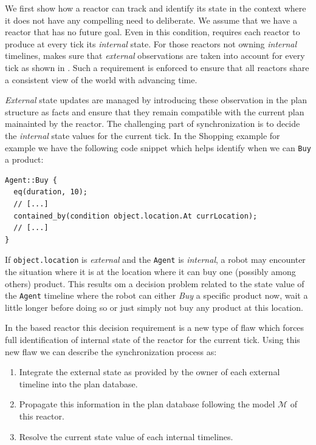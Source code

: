 We first show how a reactor can track and identify its state in the
context where it does not have any compelling need to deliberate. We
assume that we have a reactor that has no future goal. Even in this
condition, \rx requires each reactor to produce at every tick its {\em
  internal} state. For those reactors not owning {\em internal}
timelines, \rx makes sure that {\em external} observations are taken
into account for every tick as shown in \cite{py10}. Such a
requirement is enforced to ensure that all reactors share a consistent
view of the world with advancing time.

{\em External} state updates are managed by introducing these
observation in the plan structure as facts and ensure that they remain
compatible with the current plan mainainted by the reactor. The
challenging part of synchronization is to decide the {\em internal}
state values for the current tick. In the Shopping example for example
we have the following code snippet which helps identify when we can
\texttt{Buy} a product:

\begin{verbatim}
Agent::Buy {
  eq(duration, 10);
  // [...]
  contained_by(condition object.location.At currLocation);
  // [...]
}
\end{verbatim}

If \texttt{object.location} is {\em external} and the \texttt{Agent}
is {\em internal}, a robot may encounter the situation where it is at
the location where it can buy one (possibly among others)
product. This results om a decision problem related to the state value
of the \texttt{Agent} timeline where the robot can either {\em Buy} a
specific product now, wait a little longer before doing so or just
simply not buy any product at this location.

In the \eu based reactor this decision requirement is a new type of
flaw which forces full identification of internal state of the reactor
for the current tick. Using this new flaw we can describe the
synchronization process as:

\begin{enumerate}

\item Integrate the external state as provided by the owner of each
  external timeline into the plan database.

\item Propagate this information in the plan database following the
  model $\mathcal{M}$ of this reactor.

\item Resolve the current state value of each internal timelines.

\end{enumerate}

